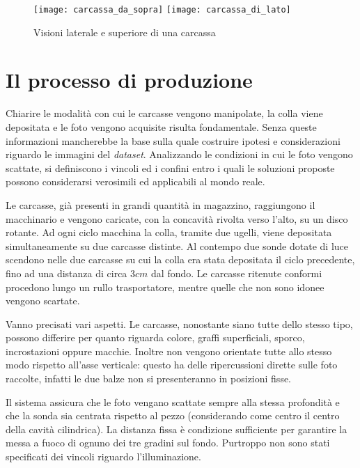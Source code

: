 \begin{figure}[h]
  \texttt{[image: carcassa\_da\_sopra]}
  \texttt{[image: carcassa\_di\_lato]}
  \caption{Visioni laterale e superiore di una carcassa}
  \label{fig:carc}
\end{figure}

\clearpage

\section{Il processo di produzione}
Chiarire le modalità con cui le carcasse vengono manipolate, la colla viene depositata e le foto vengono acquisite risulta fondamentale.
Senza queste informazioni mancherebbe la base sulla quale costruire ipotesi e considerazioni riguardo le immagini del \textit{dataset}.
Analizzando le condizioni in cui le foto vengono scattate, si definiscono i vincoli ed i confini entro i quali le soluzioni proposte possono considerarsi verosimili ed applicabili al mondo reale.

Le carcasse, già presenti in grandi quantità in magazzino, raggiungono il macchinario e vengono caricate, con la concavità rivolta verso l'alto, su un disco rotante.
Ad ogni ciclo macchina la colla, tramite due ugelli, viene depositata simultaneamente su due carcasse distinte.
Al contempo due sonde dotate di luce scendono nelle due carcasse su cui la colla era stata depositata il ciclo precedente, fino ad una distanza di circa $3cm$ dal fondo.
Le carcasse ritenute conformi procedono lungo un rullo trasportatore, mentre quelle che non sono idonee vengono scartate.

Vanno precisati vari aspetti.
Le carcasse, nonostante siano tutte dello stesso tipo, possono differire per quanto riguarda colore, graffi superficiali, sporco, incrostazioni oppure macchie.
Inoltre non vengono orientate tutte allo stesso modo rispetto all'asse verticale: questo ha delle ripercussioni dirette sulle foto raccolte, infatti le due balze non si presenteranno in posizioni fisse.

Il sistema assicura che le foto vengano scattate sempre alla stessa profondità e che la sonda sia centrata rispetto al pezzo (considerando come centro il centro della cavità cilindrica).
La distanza fissa è condizione sufficiente per garantire la messa a fuoco di ognuno dei tre gradini sul fondo.
Purtroppo non sono stati specificati dei vincoli riguardo l'illuminazione.

